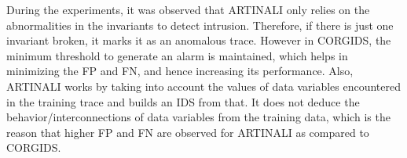 \begin{table}
\centering
  \caption{Results of intrusion detection by ARTINALI for targeted attack on SAP platform}
  \label{tab:ARTINALI_SAP_targeted}
\end{table}


\begin{table}
\centering
  \caption{Results of intrusion detection by CORGIDS for targeted attack on SAP platform}
  \label{tab:CORGIDS_SAP_targeted}
\end{table}



During the experiments, it was observed that ARTINALI only relies on the abnormalities in the invariants to detect intrusion. Therefore, if there is just one invariant broken, it marks it as an anomalous trace. However in CORGIDS, the minimum threshold to generate an alarm is maintained, which helps in minimizing the FP and FN, and hence increasing its performance. Also, ARTINALI works by taking into account the values of data variables encountered in the training trace and builds an IDS from that. It does not deduce the behavior/interconnections of data variables from the training data, which is the reason that higher FP and FN are observed for ARTINALI as compared to CORGIDS.

